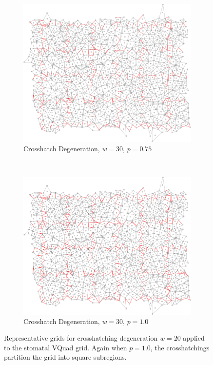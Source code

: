 \documentclass[a4paper,11pt,twoside]{report}
\begin{document}
\begin{figure}[htp]
\begin{subfigure}[t]{0.4\textwidth}
  \end{subfigure}

\begin{subfigure}[t]{0.4\textwidth}
  \centering
  \includegraphics[width=\textwidth]{ch6_figs/cross_hatch_p75_w30}
  \caption{Crosshatch Degeneration, $w=30$, $p=0.75$}

  \end{subfigure}
~
\begin{subfigure}[t]{0.4\textwidth}
  \centering
  \includegraphics[width=\textwidth]{ch6_figs/cross_hatch_p100_w30}
  \caption{Crosshatch Degeneration, $w=30$, $p=1.0$}

  \end{subfigure}

\caption[Crosshatch Degeneration, $w=30$]{
  Representative grids for crosshatching degeneration $w=20$ applied to the stomatal VQuad grid. Again when $p=1.0$, the crosshatchings partition the grid into square subregions.
}
\label{fig:ch_w30_grid}
\end{figure}
\end{document}
